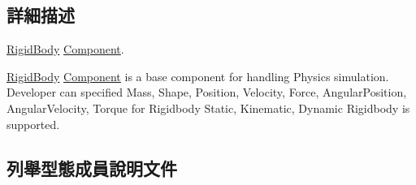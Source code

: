 \subsection{詳細描述}
\hyperlink{class_i_dream_sky_1_1_physics3_1_1_rigid_body}{Rigid\+Body} \hyperlink{class_i_dream_sky_1_1_component}{Component}. 

\hyperlink{class_i_dream_sky_1_1_physics3_1_1_rigid_body}{Rigid\+Body} \hyperlink{class_i_dream_sky_1_1_component}{Component} is a base component for handling Physics simulation. Developer can specified Mass, Shape, Position, Velocity, Force, Angular\+Position, Angular\+Velocity, Torque for Rigidbody Static, Kinematic, Dynamic Rigidbody is supported. 

\subsection{列舉型態成員說明文件}
